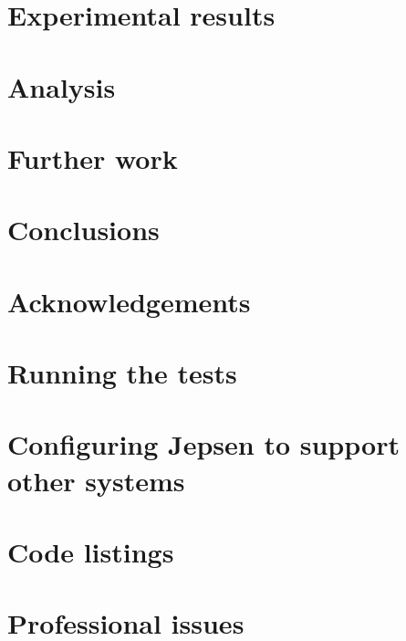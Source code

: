 \documentclass[11pt]{article} %
\theoremstyle{plain}
\theoremstyle{definition}
\begin{document}
\section{Experimental results}
\section{Analysis}
\section{Further work}
\section{Conclusions}
\section{Acknowledgements}




\appendix
\section{Running the tests}
\section{Configuring Jepsen to support other systems}
\section{Code listings}
\section{Professional issues}
\end{document}
